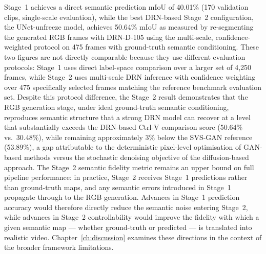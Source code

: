 Stage~1 achieves a direct semantic prediction mIoU of 40.01\% (170 validation clips, single-scale evaluation), while the best DRN-based Stage~2 configuration, the UNet-unfreeze model, achieves 50.64\% mIoU as measured by re-segmenting the generated RGB frames with DRN-D-105 using the multi-scale, confidence-weighted protocol on 475 frames with ground-truth semantic conditioning. These two figures are not directly comparable because they use different evaluation protocols: Stage~1 uses direct label-space comparison over a larger set of 4{,}250 frames, while Stage~2 uses multi-scale DRN inference with confidence weighting over 475 specifically selected frames matching the reference benchmark evaluation set. Despite this protocol difference, the Stage~2 result demonstrates that the RGB generation stage, under ideal ground-truth semantic conditioning, reproduces semantic structure that a strong DRN model can recover at a level that substantially exceeds the DRN-based Ctrl-V comparison score (50.64\% vs.\ 30.48\%), while remaining approximately 3\% below the SVS-GAN reference (53.89\%), a gap attributable to the deterministic pixel-level optimisation of GAN-based methods versus the stochastic denoising objective of the diffusion-based approach. The Stage~2 semantic fidelity metric remains an upper bound on full pipeline performance: in practice, Stage~2 receives Stage~1 predictions rather than ground-truth maps, and any semantic errors introduced in Stage~1 propagate through to the RGB generation. Advances in Stage~1 prediction accuracy would therefore directly reduce the semantic noise entering Stage~2, while advances in Stage~2 controllability would improve the fidelity with which a given semantic map — whether ground-truth or predicted — is translated into realistic video. Chapter~\ref{ch:discussion} examines these directions in the context of the broader framework limitations.
